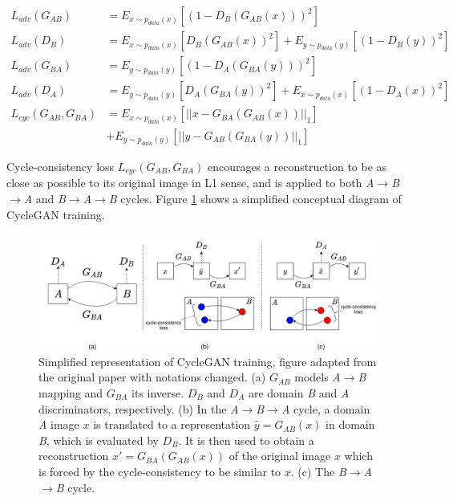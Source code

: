 \begin{equation}
    \begin{aligned}
    L_{adv}(G_{AB}) &= E_{x \sim p_{data}(x)} [(1 - D_B(G_{AB}(x)))^2]  \\[1mm]
    L_{adv}(D_B) &= E_{x \sim p_{data}(x)} [D_B(G_{AB}(x))^2] + E_{y \sim p_{data}(y)} [(1 - D_B(y))^2] \\[4mm]
    L_{adv}(G_{BA}) &= E_{y \sim p_{data}(y)} [(1 - D_A(G_{BA}(y)))^2]  \\[1mm]
    L_{adv}(D_A) &= E_{y \sim p_{data}(y)} [D_A(G_{BA}(y))^2] + E_{x \sim p_{data}(x)} [(1 - D_A(x))^2] \\[4mm]
    L_{cyc}(G_{AB}, G_{BA}) &= E_{x \sim p_{data}(x)} [|| x - G_{BA}(G_{AB}(x)) ||_1]  \\
                            &+ E_{y \sim p_{data}(y)} [|| y - G_{AB}(G_{BA}(y)) ||_1] 
    \end{aligned}
    \label{eq:cyclegan_naive_loss_expansion}
\end{equation}

Cycle-consistency loss $L_{cyc}(G_{AB}, G_{BA})$ encourages a reconstruction to be as close as possible to its original image in L1 sense, and is applied to both \textit{A}$\rightarrow$\textit{B}$\rightarrow$\textit{A} and \textit{B}$\rightarrow$\textit{A}$\rightarrow$\textit{B} cycles. Figure \ref{fig:cyclegan_concept} shows a simplified conceptual diagram of CycleGAN training.

\begin{figure}
    \centering
    \includegraphics[width=\textwidth]{figures/GANs/cyclegan_concept.png}
    \caption{Simplified representation of CycleGAN training, figure adapted from the original paper \cite{zhu2017unpaired} with notations changed. (a) $G_{AB}$ models \textit{A}$\rightarrow$\textit{B} mapping and $G_{BA}$ its inverse. $D_B$ and $D_A$ are domain \textit{B} and \textit{A} discriminators, respectively. (b) In the \textit{A}$\rightarrow$\textit{B}$\rightarrow$\textit{A} cycle, a domain \textit{A} image $x$ is translated to a representation \textit{$\hat{y} = G_{AB}(x)$} in domain \textit{B}, which is evaluated by $D_B$. It is then used to obtain a reconstruction $x' = G_{BA}(G_{AB}(x))$ of the original image $x$ which is forced by the cycle-consistency to be similar to $x$. (c) The \textit{B}$\rightarrow$\textit{A}$\rightarrow$\textit{B} cycle.}
    \label{fig:cyclegan_concept}
\end{figure}


